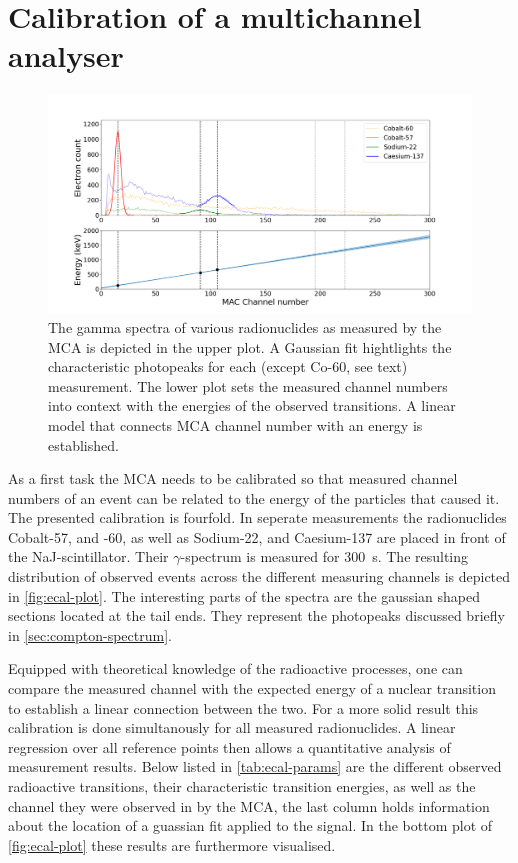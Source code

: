 
\section{Calibration of a multichannel analyser}
\label{sec:ecal}

\begin{figure}
	\includegraphics[width=1.0\textwidth]{./fig/ecal-plot.png}
	\caption{The gamma spectra of various radionuclides as measured by the MCA
	is depicted in the upper plot. A Gaussian fit hightlights the characteristic
	photopeaks for each (except Co-60, see text) measurement. The lower plot
	sets the measured channel numbers into context with the energies of the
	observed transitions. A linear model that connects MCA channel number with an
	energy is established.}
	\label{fig:ecal-plot}
\end{figure}

As a first task the MCA needs to be calibrated so that measured channel numbers of an
event can be related to the energy of the particles that caused it. The presented
calibration is fourfold. In seperate measurements the radionuclides Cobalt-57, and
-60, as well as Sodium-22, and Caesium-137 are placed in front of the
NaJ-scintillator. Their $\gamma$-spectrum is measured for \SI{300}{\second}. The
resulting distribution of observed events across the different measuring channels is
depicted in \autoref{fig:ecal-plot}. The interesting parts of the spectra are the
gaussian shaped sections located at the tail ends. They represent the photopeaks
discussed briefly in \autoref{sec:compton-spectrum}.

Equipped with theoretical knowledge of the radioactive processes, one can compare the
measured channel with the expected energy of a nuclear transition to establish a
linear connection between the two. For a more solid result this calibration is done
simultanously for all measured radionuclides. A linear regression over all reference
points then allows a quantitative analysis of measurement results. Below listed in
\autoref{tab:ecal-params} are the different observed radioactive transitions, their
characteristic transition energies, as well as the channel they were observed in by
the MCA, the last column holds information about the location of a guassian fit
applied to the signal. In the bottom plot of \autoref{fig:ecal-plot} these results
are furthermore visualised.

